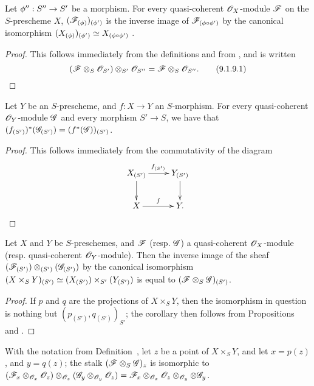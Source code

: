 \begin{proposition}[9.1.9]
\label{I.9.1.9}
Let $\vphi'':S''\to S'$ be a morphism.
For every quasi-coherent $\mathscr{O}_X$-module $\mathscr{F}$ on the $S$-prescheme $X$,
$(\mathscr{F}_{(\phi)})_{(\phi')}$ is the inverse image of
$\mathscr{F}_{(\phi\circ\phi')}$ by the canonical isomorphism
$(X_{(\phi)})_{(\phi')}\simeq X_{(\phi\circ\phi')}$
.
\end{proposition}

\begin{proof}
This follows immediately from the definitions and from , and is
written
\[
\label{I.9.1.9.1}
  (\mathscr{F}\otimes_S\mathscr{O}_{S'})\otimes_{S'}\mathscr{O}_{S''}=\mathscr{F}\otimes_S\mathscr{O}_{S''}.
  \tag{9.1.9.1}
\]
\end{proof}

\begin{proposition}[9.1.10]
\label{I.9.1.10}
Let $Y$ be an $S$-prescheme, and $f:X\to Y$ an $S$-morphism.
For every quasi-coherent $\mathscr{O}_Y$-module $\mathscr{G}$ and every morphism
$S'\to S$, we have that
$(f_{(S')})^*(\mathscr{G}_{(S')})=(f^*(\mathscr{G}))_{(S')}$.
\end{proposition}

\begin{proof}
This follows immediately from the commutativity of the diagram
\[
  \xymatrix{
    X_{(S')}\ar[r]^{f_{(S')}}\ar[d] &
    Y_{(S')}\ar[d]\\
    X\ar[r]^f &
    Y.
  }
\]
\end{proof}

\begin{corollary}[9.1.11]
\label{I.9.1.11}
Let $X$ and $Y$ be $S$-preschemes, and
$\mathscr{F}$ (resp. $\mathscr{G}$) a quasi-coherent $\mathscr{O}_X$-module
(resp. quasi-coherent $\mathscr{O}_Y$-module). Then the inverse image of the sheaf
$(\mathscr{F}_{(S')})\otimes_{(S')}(\mathscr{G}_{(S')})$ by the canonical isomorphism
$(X\times_S Y)_{(S')}\simeq(X_{(S')})\times_{S'}(Y_{(S')})$
 is equal to $(\mathscr{F}\otimes_S\mathscr{G})_{(S')}$.
\end{corollary}

\begin{proof}
If $p$ and $q$ are the projections of $X\times_S Y$, then the isomorphism in question
is nothing but $(p_{(S')}, q_{(S')})_{S'}$; the corollary then follows from
Propositions~ and .
\end{proof}

\begin{proposition}[9.1.12]
\label{I.9.1.12}
With the notation from Definition~, let $z$ be
a point of $X\times_S Y$, and let $x=p(z)$, and $y=q(z)$; the stalk
$(\mathscr{F}\otimes_S\mathscr{G})_z$ is isomorphic to
$(\mathscr{F}_x\otimes_{\mathscr{O}_x}\mathscr{O}_z)\otimes_{\mathscr{O}_z}(\mathscr{G}_y\otimes_{\mathscr{O}_y}\mathscr{O}_z)
  =\mathscr{F}_x\otimes_{\mathscr{O}_x}\mathscr{O}_z\otimes_{\mathscr{O}_y}\otimes\mathscr{G}_y$.
\end{proposition}

